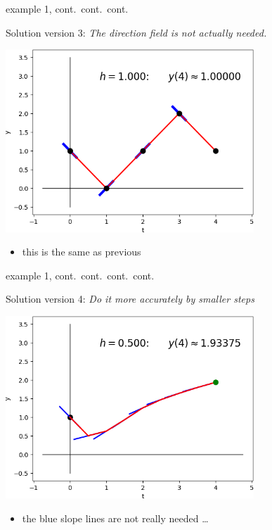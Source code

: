 \documentclass[colorlinks]{beamer}
\begin{document}
\begin{frame}{example 1, cont.~cont.~cont.}

Solution version 3: \emph{The direction field is not actually needed.}

\bigskip
\hfill \includegraphics[width=0.7\textwidth]{figs/sequence-3}

\begin{itemize}
\item this is the same as previous
\end{itemize}
\end{frame}


\begin{frame}{example 1, cont.~cont.~cont.~cont.}

Solution version 4: \emph{Do it more accurately by smaller steps}

\bigskip
\hfill \includegraphics[width=0.7\textwidth]{figs/sequence-4}

\begin{itemize}
\item the blue slope lines are not really needed \dots
\end{itemize}
\end{frame}
\end{document}
